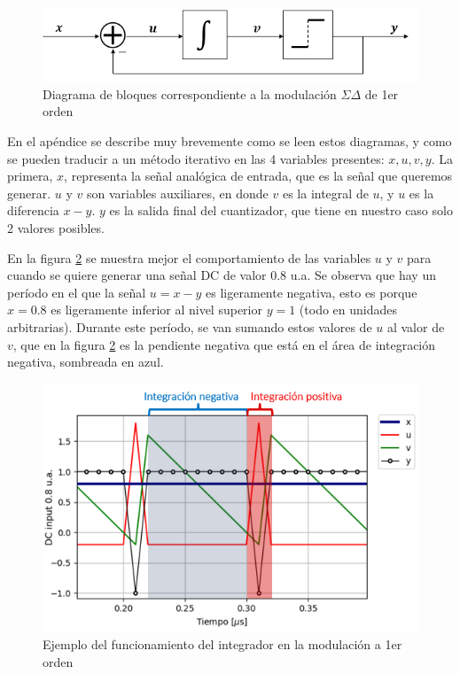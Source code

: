 \documentclass[twoside]{article}
\begin{document}
\begin{multicols}{2}
\begin{figure}[H]
\centering
\includegraphics[width=\linewidth]{figuras/bloques_1erorden.png}
\caption{Diagrama de bloques correspondiente a la modulación $\Sigma\Delta$ de 1er orden}
\label{fig:bloques}
\end{figure}

En el apéndice se describe muy brevemente como se leen estos diagramas, y como se pueden traducir a un método iterativo en las 4 variables presentes: $x,u,v,y$.
La primera, $x$, representa la señal analógica de entrada, que es la señal que queremos generar. $u$ y $v$ son variables auxiliares, en donde $v$ es la integral de $u$, y $u$ es la diferencia $x-y$. $y$ es la salida final del cuantizador, que tiene en nuestro caso solo 2 valores posibles.



En la figura \ref{fig:integrador} se muestra mejor el comportamiento de las variables $u$ y $v$ para cuando se quiere generar una señal DC de valor 0.8 u.a. Se observa que hay un período en el que la señal $u=x-y$ es ligeramente negativa, esto es porque $x=0.8$ es ligeramente inferior al nivel superior $y=1$ (todo en unidades arbitrarias). Durante este período, se van sumando estos valores de $u$ al valor de $v$, que en la figura \ref{fig:integrador} es la pendiente negativa que está en el área de integración negativa, sombreada en azul.


\begin{figure}[H]
\centering
\includegraphics[width=\linewidth]{figuras/integracion.png}
\caption{Ejemplo del funcionamiento del integrador en la modulación a 1er orden}
\label{fig:integrador}
\end{figure}


\end{multicols}
\end{document}
